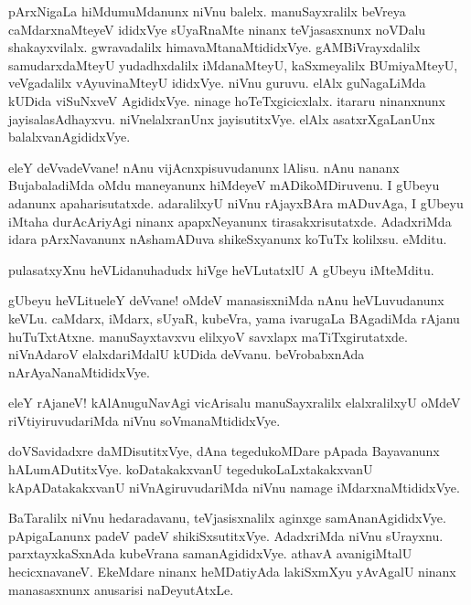 \begin{mng}
pArxNigaLa hiMdumuMdanunx niVnu balelx. manuSayxralilx beVreya caMdarxnaMteyeV ididxVye sUyaRnaMte ninanx teVjasasxnunx noVDalu shakayxvilalx. gwravadalilx himavaMtanaMtididxVye. gAMBiVrayxdalilx samudarxdaMteyU yudadhxdalilx iMdanaMteyU, kaSxmeyalilx BUmiyaMteyU, veVgadalilx vAyuvinaMteyU ididxVye. niVnu guruvu. elAlx guNagaLiMda kUDida viSuNxveV AgididxVye. ninage hoTeTxgicicxlalx. itararu ninanxnunx jayisalasAdhayxvu. niVnelalxranUnx jayisutitxVye. elAlx asatxrXgaLanUnx balalxvanAgididxVye.
\end{mng}

\begin{mng}
eleY deVvadeVvane! nAnu vijAcnxpisuvudanunx lAlisu. nAnu nananx BujabaladiMda oMdu maneyanunx hiMdeyeV mADikoMDiruvenu. I gUbeyu adanunx apaharisutatxde. adaralilxyU niVnu rAjayxBAra mADuvAga, I gUbeyu iMtaha durAcAriyAgi ninanx apapxNeyanunx tirasakxrisutatxde. AdadxriMda idara pArxNavanunx nAshamADuva shikeSxyanunx koTuTx kolilxsu. eMditu.
\end{mng}

\begin{mng}
pulasatxyXnu heVLidanu\mdash hadudx hiVge heVLutatxlU A gUbeyu iMteMditu.
\end{mng}

\begin{mng}
gUbeyu heVLitu\mdash eleY deVvane! oMdeV manasisxniMda nAnu heVLuvudanunx keVLu. caMdarx, iMdarx, sUyaR, kubeVra, yama ivarugaLa BAgadiMda rAjanu huTuTxtAtxne. manuSayxtavxvu elilxyoV savxlapx maTiTxgirutatxde. niVnAdaroV elalxdariMdalU kUDida deVvanu. beVrobabxnAda nArAyaNanaMtididxVye.
\end{mng}

\begin{mng}
eleY rAjaneV! kAlAnuguNavAgi vicArisalu manuSayxralilx elalxralilxyU oMdeV riVtiyiruvudariMda niVnu soVmanaMtididxVye.
\end{mng}

\begin{mng}
doVSavidadxre daMDisutitxVye, dAna tegedukoMDare pApada Bayavanunx hALumADutitxVye. koDatakakxvanU tegedukoLaLxtakakxvanU kApADatakakxvanU niVnAgiruvudariMda niVnu namage iMdarxnaMtididxVye.
\end{mng}

\begin{mng}
BaTaralilx niVnu hedaradavanu, teVjasisxnalilx aginxge samAnanAgididxVye. pApigaLanunx padeV padeV shikiSxsutitxVye. AdadxriMda niVnu sUrayxnu. parxtayxkaSxnAda kubeVrana samanAgididxVye. athavA avanigiMtalU hecicxnavaneV. EkeMdare ninanx heMDatiyAda lakiSxmXyu yAvAgalU ninanx manasasxnunx anusarisi naDeyutAtxLe.
\end{mng}

